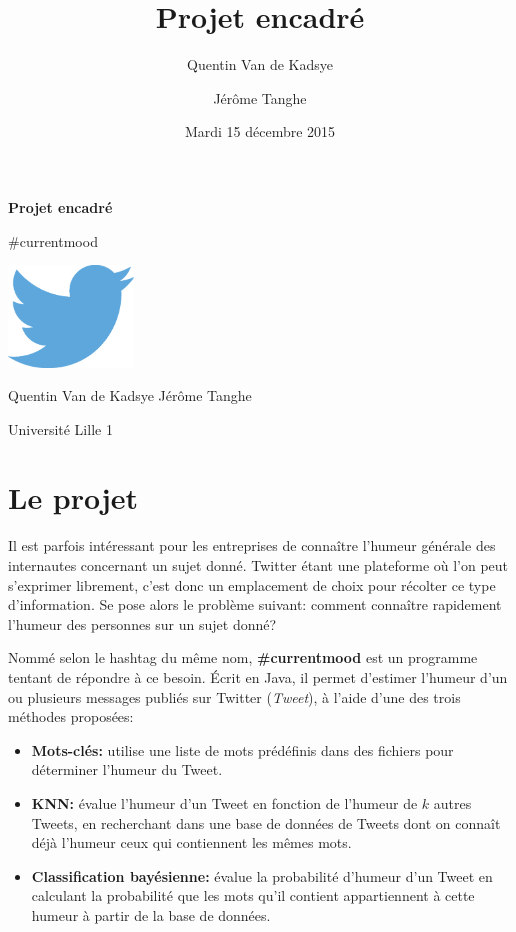 \documentclass[12pt,a4paper]{report}
\title{Projet encadré\\\CMName}
\author{Quentin Van de Kadsye \and Jérôme Tanghe}
\date{Mardi 15 décembre 2015}
\newcommand{\CMName}{\#currentmood}
\begin{document}
{}
\begin{titlepage}
	\centering
	{%
		\Huge

		\textbf{Projet encadré}

		\CMName%

		\vfill

		\includegraphics[width=0.25\textwidth]{img/TwitterLogo.eps}

		\Large
		\vfill

		Quentin Van de Kadsye
		\hspace{2cm}
		Jérôme Tanghe

		\vfill
		Université Lille 1
	}
\end{titlepage}


\setcounter{tocdepth}{1}
\tableofcontents


\chapter{Le projet}

Il est parfois intéressant pour les entreprises de connaître l'humeur générale
des internautes concernant un sujet donné. Twitter étant une plateforme où l'on peut
s'exprimer librement, c'est donc un emplacement de choix pour récolter ce type
d'information. Se pose alors le problème suivant: comment connaître rapidement
l'humeur des personnes sur un sujet donné?

Nommé selon le hashtag du même nom, \textbf{\CMName} est un programme tentant de
répondre à ce besoin. Écrit en Java, il permet d'estimer l'humeur d'un ou
plusieurs messages publiés sur Twitter (\textit{Tweet}), à l'aide d'une des trois méthodes proposées:

\begin{itemize}
	\item
		\textbf{Mots-clés:} utilise une liste de mots prédéfinis dans des
		fichiers pour déterminer l'humeur du Tweet.
	\item
		\textbf{KNN:} évalue l'humeur d'un Tweet en fonction de l'humeur de $k$
		autres Tweets, en recherchant dans une base de données de Tweets dont on
		connaît déjà l'humeur ceux qui contiennent les mêmes mots.
	\item
		\textbf{Classification bayésienne:} évalue la probabilité d'humeur d'un
		Tweet en calculant la probabilité que les mots qu'il contient
		appartiennent à cette humeur à partir de la base de données.
\end{itemize}
\end{document}
